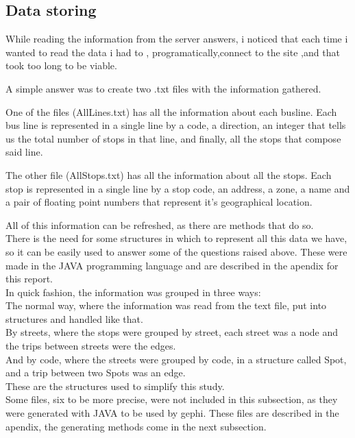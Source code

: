 \documentclass[12pt]{article}
\begin{document}
\subsection{Data storing}
While reading the information from the server answers, i noticed that each time i wanted to read the data i had to , programatically,connect to the site ,and that took too long to be viable. 

A simple answer was to create two .txt files with the information gathered.

One of the files (AllLines.txt) has all the information about each busline.
Each bus line is represented in a single line by a code, a direction, an integer that tells us the total number of stops in that line, and finally, all the stops that compose said line.

The other file (AllStops.txt) has all the information about all the stops.
Each stop is represented in a single line by a stop code, an address, a zone, a name and a pair of floating point numbers that represent it's geographical location. 

All of this information can be refreshed, as there are methods that do so.\\

There is the need for some structures in which to represent all this data we have, so it can be easily used to answer some of the questions raised above. These were made in the JAVA programming language and are described in the apendix for this report.\\

	In quick fashion, the information was grouped in three ways:\\
	
	The normal way, where the information was read from the text file, put into structures and handled like that.\\
	
	 By streets, where the stops were grouped by street, each street was a node and the trips between streets were the edges.\\
	 
	 And by code, where the streets were grouped by code, in a structure called Spot, and a trip between two Spots was an edge.\\
	
	These are the structures used to simplify this study.\\
	Some files, six to be more precise, were not included in this subsection, as they were generated with JAVA to be used by gephi.
	These files are described in the apendix, the generating methods come in the next subsection.
\end{document}
